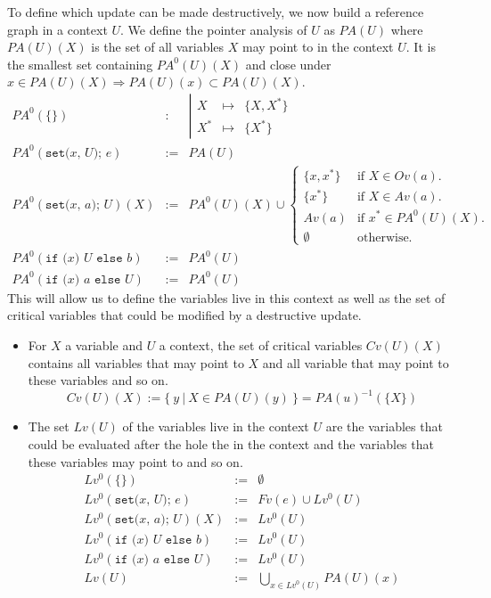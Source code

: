 \documentclass[12pt,a4paper]{article}
\newcommand{\cl}[1]{\texttt{#1}}
\newcommand{\ucont}[1]{\{#1\}}
\begin{document}
To define which update can be made destructively, we now build a reference graph in a context $U$. We define the pointer analysis of $U$ as $PA(U)$ where $PA(U)(X)$ is the set of all variables $X$ may point to in the context $U$. It is the smallest set containing $PA^0(U)(X)$ and close under $x \in PA(U)(X) \Longrightarrow PA(U)(x) \subset PA(U)(X)$.
\begin{eqnarray*}
PA^0(\ucont{} ) &:& \left| \begin{array}{lcl}
X   & \mapsto & \{ X, X^* \} \\
X^* & \mapsto & \{ X^* \}
\end{array}  \right. \\
PA^0( \cl{set(} x \cl{, } U \cl{); } e ) &:=& PA(U) \\
PA^0( \cl{set(} x \cl{, } a \cl{); } U )(X) &:=& PA^0(U)(X) \cup \left\lbrace \begin{array}{ll}
\{ x, x^* \} & \text{if $X \in Ov(a)$.} \\
\{ x^* \} & \text{if $X \in Av(a)$.} \\
Av(a) & \text{if $x^* \in PA^0(U)(X)$.} \\
\emptyset & \text{otherwise.}
\end{array} \right. \\
PA^0( \cl{if (} x \cl{) } U \cl{ else } b ) &:=& PA^0(U) \\
PA^0( \cl{if (} x \cl{) } a \cl{ else } U ) &:=& PA^0(U) 
\end{eqnarray*}
This will allow us to define the variables live in this context as well as the set of critical variables that could be modified by a destructive update.
\begin{itemize}
\item For $X$ a variable and $U$ a context, the set of critical variables $Cv(U)(X)$ contains all variables that may point to $X$ and all variable that may point to these variables and so on.
$$ Cv(U)(X) := \{ \ y \ | \ X \in PA(U)(y) \ \} = PA(u)^{-1}(\{X \}) $$
\item The set $Lv(U)$ of the variables live in the context $U$ are the variables that could be evaluated after the hole the in the context and the variables that these variables may point to and so on.
\begin{eqnarray*}
Lv^0(\ucont{} ) &:=& \emptyset \\
Lv^0( \cl{set(} x \cl{, } U \cl{); } e ) &:=& Fv(e) \cup Lv^0(U) \\
Lv^0( \cl{set(} x \cl{, } a \cl{); } U )(X) &:=& Lv^0(U) \\
Lv^0( \cl{if (} x \cl{) } U \cl{ else } b ) &:=& Lv^0(U) \\
Lv^0( \cl{if (} x \cl{) } a \cl{ else } U ) &:=& Lv^0(U) \\
Lv(U) &:=& \bigcup_{x\in Lv^0(U)} PA(U)(x)
\end{eqnarray*}
\end{itemize}
\end{document}
